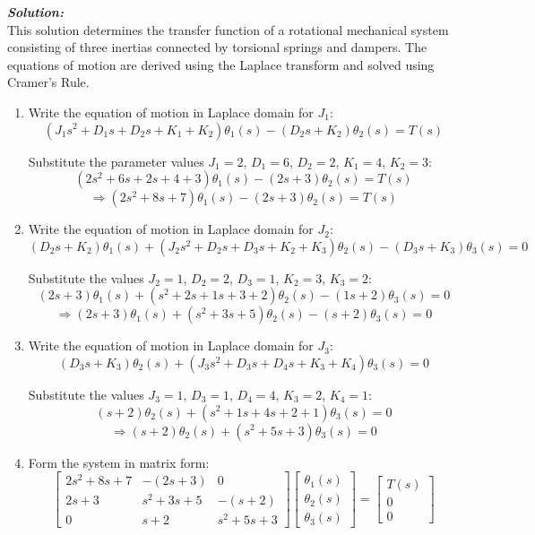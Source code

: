 \documentclass[11pt]{article}
\begin{document}
\vspace{12pt}   

\noindent \textbf{\textit{Solution:}}
\\ This solution determines the transfer function of a rotational mechanical system consisting of three inertias connected by torsional springs and dampers. The equations of motion are derived using the Laplace transform and solved using Cramer's Rule.\\

\begin{enumerate}[label=(\alph*), itemindent=*, leftmargin=*, nolistsep]
    \item Write the equation of motion in Laplace domain for $J_1$:
    \[
        (J_1 s^2 + D_1 s + D_2 s + K_1 + K_2)\theta_1(s) - \left(D_2 s + K_2\right)\theta_2(s) = T(s)
    \]

    Substitute the parameter values $J_1 = 2$, $D_1 = 6$, $D_2 = 2$, $K_1 = 4$, $K_2 = 3$:
    \[
    (2s^2 + 6s + 2s + 4 + 3)\theta_1(s) - (2s + 3)\theta_2(s) = T(s)
    \]
    \[
    \Rightarrow (2s^2 + 8s + 7)\theta_1(s) - (2s + 3)\theta_2(s) = T(s)
    \]

    \item Write the equation of motion in Laplace domain for $J_2$:
    \[
    (D_2 s + K_2)\theta_1(s) + (J_2 s^2 + D_2 s + D_3 s + K_2 + K_3)\theta_2(s) - (D_3 s + K_3)\theta_3(s) = 0
    \]

    Substitute the values $J_2 = 1$, $D_2 = 2$, $D_3 = 1$, $K_2 = 3$, $K_3 = 2$:
    \[
    (2s + 3)\theta_1(s) + (s^2 + 2s + 1s + 3 + 2)\theta_2(s) - (1s + 2)\theta_3(s) = 0
    \]
    \[
    \Rightarrow (2s + 3)\theta_1(s) + (s^2 + 3s + 5)\theta_2(s) - (s + 2)\theta_3(s) = 0
    \]

    \item Write the equation of motion in Laplace domain for $J_3$:
    \[
    (D_3 s + K_3)\theta_2(s) + (J_3 s^2 + D_3 s + D_4 s + K_3 + K_4)\theta_3(s) = 0
    \]

    Substitute the values $J_3 = 1$, $D_3 = 1$, $D_4 = 4$, $K_3 = 2$, $K_4 = 1$:
    \[
    (s + 2)\theta_2(s) + (s^2 + 1s + 4s + 2 + 1)\theta_3(s) = 0
    \]
    \[
    \Rightarrow (s + 2)\theta_2(s) + (s^2 + 5s + 3)\theta_3(s) = 0
    \]

    \item Form the system in matrix form:
    \[
    \begin{bmatrix}
    2s^2 + 8s + 7 & -(2s + 3) & 0 \\
    2s + 3 & s^2 + 3s + 5 & -(s + 2) \\
    0 & s + 2 & s^2 + 5s + 3
    \end{bmatrix}
    \begin{bmatrix}
    \theta_1(s) \\ \theta_2(s) \\ \theta_3(s)
    \end{bmatrix}
    =
    \begin{bmatrix}
    T(s) \\ 0 \\ 0
    \end{bmatrix}
    \]


\end{enumerate}
\end{document}
